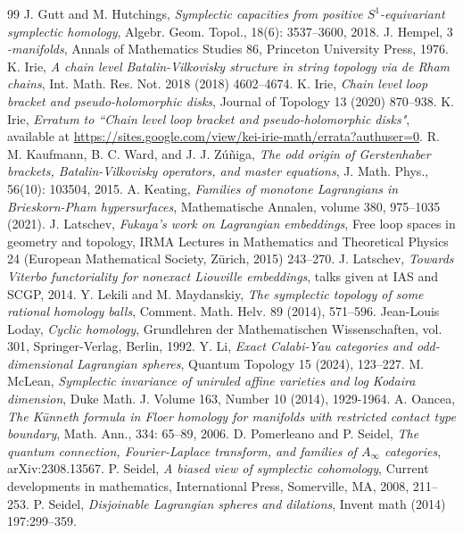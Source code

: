 \documentclass[a4paper]{article}
\numberwithin{equation}{section}
\begin{document}
\begin{thebibliography}{99}
J. Gutt and M. Hutchings, \textit{Symplectic capacities from positive $S^1$-equivariant symplectic homology}, Algebr. Geom. Topol., 18(6): 3537--3600, 2018.
J. Hempel, \textit{$3$-manifolds}, Annals of Mathematics Studies 86, Princeton University Press, 1976.
K. Irie, \textit{A chain level Batalin-Vilkovisky structure in string topology via de Rham chains}, Int. Math. Res. Not. 2018 (2018) 4602--4674.
K. Irie, \textit{Chain level loop bracket and pseudo-holomorphic disks}, Journal of Topology 13 (2020) 870--938.
K. Irie, \textit{Erratum to ``Chain level loop bracket and pseudo-holomorphic disks"}, available at \url{https://sites.google.com/view/kei-irie-math/errata?authuser=0}.
R. M. Kaufmann, B. C. Ward, and J. J. Z\'{u}\~{n}iga, \textit{The odd origin of Gerstenhaber
brackets, Batalin-Vilkovisky operators, and master equations}, J. Math. Phys., 56(10): 103504, 2015.
A. Keating, \textit{Families of monotone Lagrangians in Brieskorn-Pham hypersurfaces}, Mathematische Annalen, volume 380, 975--1035 (2021).
J. Latschev, \textit{Fukaya’s work on Lagrangian embeddings}, Free loop spaces in geometry and topology, IRMA Lectures in Mathematics and Theoretical Physics 24 (European Mathematical Society, Z\"{u}rich, 2015) 243--270.
J. Latschev, \textit{Towards Viterbo functoriality for nonexact Liouville embeddings}, talks given at IAS and SCGP, 2014.
Y. Lekili and M. Maydanskiy, \textit{The symplectic topology of some rational homology balls}, Comment. Math. Helv. 89 (2014), 571--596.
Jean-Louis Loday, \textit{Cyclic homology}, Grundlehren der Mathematischen Wissenschaften, vol. 301, Springer-Verlag, Berlin, 1992.
Y. Li, \textit{Exact Calabi-Yau categories and odd-dimensional Lagrangian spheres}, Quantum Topology 15 (2024), 123--227.
M. McLean, \textit{Symplectic invariance of uniruled affine varieties and log Kodaira dimension}, Duke Math. J. Volume 163, Number 10 (2014), 1929-1964.
A. Oancea, \textit{The K\"{u}nneth formula in Floer homology for manifolds with restricted contact type boundary}, Math. Ann., 334: 65--89, 2006.
D. Pomerleano and P. Seidel, \textit{The quantum connection, Fourier-Laplace transform, and families of $A_\infty$ categories}, arXiv:2308.13567.
P. Seidel, \textit{A biased view of symplectic cohomology}, Current developments in mathematics, International Press, Somerville, MA, 2008, 211--253.
P. Seidel, \textit{Disjoinable Lagrangian spheres and dilations}, Invent math (2014) 197:299--359.

\end{thebibliography}
\end{document}
